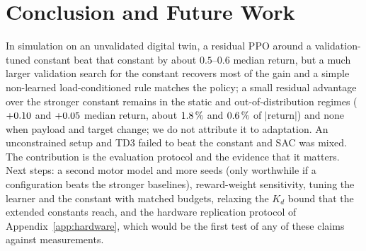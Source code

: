 \section{Conclusion and Future Work}
In simulation on an unvalidated digital twin, a residual PPO around a validation-tuned constant beat that constant by about $0.5$--$0.6$ median return, but a much larger validation search for the constant recovers most of the gain and a simple non-learned load-conditioned rule matches the policy; a small residual advantage over the stronger constant remains in the static and out-of-distribution regimes ($+0.10$ and $+0.05$ median return, about $1.8\,\%$ and $0.6\,\%$ of $|$return$|$) and none when payload and target change; we do not attribute it to adaptation. An unconstrained setup and TD3 failed to beat the constant and SAC was mixed. The contribution is the evaluation protocol and the evidence that it matters. Next steps: a second motor model and more seeds (only worthwhile if a configuration beats the stronger baselines), reward-weight sensitivity, tuning the learner and the constant with matched budgets, relaxing the $K_d$ bound that the extended constants reach, and the hardware replication protocol of Appendix~\ref{app:hardware}, which would be the first test of any of these claims against measurements.
